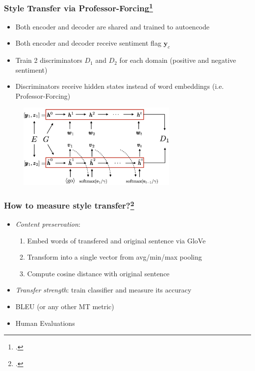 \documentclass[10pt]{beamer}
\begin{document}
\begin{frame}
\frametitle{Style Transfer via Professor-Forcing\footcite{StyleTransferByCrossAlignment}}
\begin{itemize}
    \item Both encoder and decoder are shared and trained to autoencode
    \item Both encoder and decoder receive sentiment flag $\bm y_c$
    \item Train 2 discriminators $D_1$ and $D_2$ for each domain (positive and negative sentiment)
    \item Discriminators receive hidden states instead of word embeddings (i.e. Professor-Forcing)
\end{itemize}

\begin{figure}
\centering
\includegraphics[width=0.7\textwidth]{images/style-transfer-via-professor-forcing}
\end{figure}
\end{frame}


\begin{frame}
\frametitle{How to measure style transfer?\footcite{Text_Style_Transfer_Exploration_and_Evaluation}}

\begin{itemize}
    \item \textit{Content preservation}:
    \begin{enumerate}
        \item Embed words of transfered and original sentence via GloVe
        \item Transform into a single vector from avg/min/max pooling
        \item Compute cosine distance with original sentence
    \end{enumerate}
    \item \textit{Transfer strength}: train classifier and measure its accuracy
    \item BLEU (or any other MT metric)
    \item Human Evaluations
\end{itemize}

\end{frame}
\end{document}
